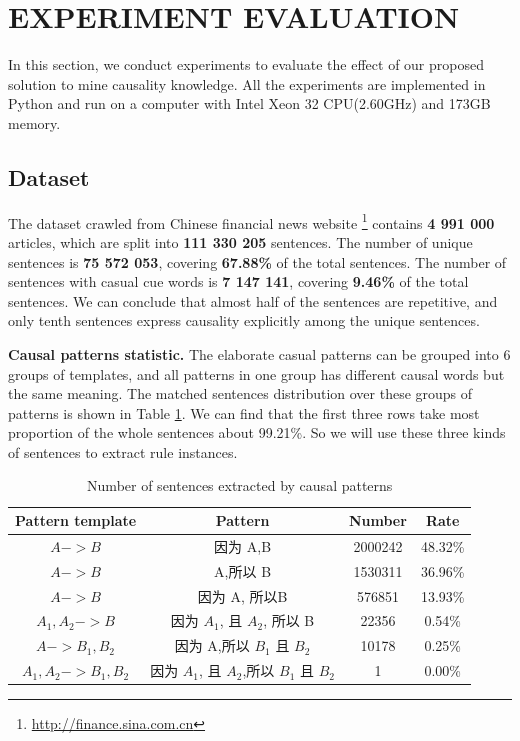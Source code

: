 \section{EXPERIMENT EVALUATION}
\label{sec:experiment}

In this section, we conduct experiments to evaluate the effect of our proposed solution to mine causality knowledge. All the experiments are implemented in Python and run on a computer with Intel Xeon 32 CPU(2.60GHz) and 173GB memory.

\subsection{Dataset}
The dataset crawled from Chinese financial news website \footnote{\url{ http://finance.sina.com.cn}} contains \textbf{4 991 000} articles, which are split into \textbf{111 330 205} sentences. The number of unique sentences is \textbf{75 572 053}, covering  \textbf{67.88\%} of the total sentences. The number of sentences with casual cue words is \textbf{7 147 141}, covering \textbf{9.46\%} of the total sentences. We can conclude that almost half of the sentences are repetitive, and only tenth sentences express causality explicitly among the unique sentences.

\textbf{Causal patterns statistic.} The elaborate casual patterns can be grouped into 6 groups of templates, and all patterns in one group has different causal words but the same meaning. The matched sentences distribution over these groups of patterns is shown in Table \ref{tab:pattern_statistics}. We can find that the first three rows take most proportion of the whole sentences about 99.21\%. So we will use these three kinds of sentences to extract rule instances.

\begin{table}[htbp]
	\caption{Number of sentences extracted by causal patterns}
	\begin{center}
		\begin{tabular}{|c|c|c|c|}
			\hline
			\textbf{Pattern template}& \textbf{Pattern}& \textbf{Number}& \textbf{Rate}\\
			\hline
			$A->B$&因为 A,B&2000242&48.32\%\\
			\hline
			$A->B$&A,所以 B&1530311&36.96\%\\
			\hline
			$A->B$&因为 A, 所以B&576851&13.93\%\\
			\hline
			$A_1,A_2->B$&因为 $A_1$, 且 $A_2$, 所以 B&22356&0.54\%\\
			\hline
			$A->B_1,B_2$&因为 A,所以 $B_1$ 且 $B_2$&10178&0.25\%\\
			\hline
			$A_1,A_2->B_1,B_2$&因为 $A_1$, 且 $A_2$,所以 $B_1$  且 $B_2$&1& 0.00\%\\
			\hline
		\end{tabular}
		\label{tab:pattern_statistics}
	\end{center}
\end{table}	


